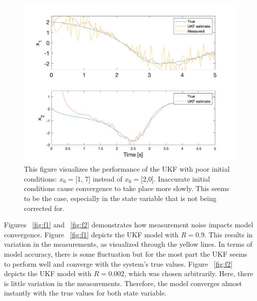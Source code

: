 \begin{figure}[ht]
    \centering
    \includegraphics[scale = 0.6]{VDP_badinitial.png}
    \caption{This figure visualizes the performance of the UKF with poor initial conditions: $x_0=$[1, 7]  instead of $x_0=$[2,0]. Inaccurate initial conditions cause convergence to take place more slowly. This seems to be the case, especially in the state variable that is not being corrected for.}
    \label{fig:BADVDP}
\end{figure}

\clearpage

\noindent Figures ~\ref{fig:f1} and ~\ref{fig:f2} demonstrates how measurement noise impacts model convergence. Figure ~\ref{fig:f1} depicts the UKF model with $R=0.9$. This results in variation in the measurements, as visualized through the yellow lines. In terms of model accuracy, there is some fluctuation but for the most part the UKF seems to perform well and converge with the system's true values. Figure ~\ref{fig:f2} depicts the UKF model with $R=0.002$, which was chosen arbitrarily. Here, there is little variation in the measurements. Therefore, the model converges almost instantly with the true values for both state variable.  


